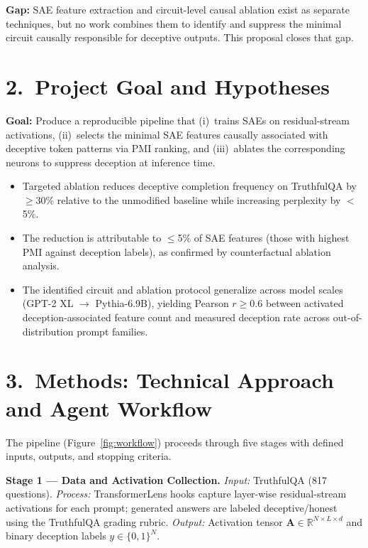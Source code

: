 \documentclass[11pt]{article}
\begin{document}
\textbf{Gap:} SAE feature extraction and circuit-level causal ablation exist as separate techniques, but no work combines them to identify and suppress the minimal circuit causally responsible for deceptive outputs. This proposal closes that gap.

\section*{2.~Project Goal and Hypotheses}

\textbf{Goal:} Produce a reproducible pipeline that (i)~trains SAEs on residual-stream activations, (ii)~selects the minimal SAE features causally associated with deceptive token patterns via PMI ranking, and (iii)~ablates the corresponding neurons to suppress deception at inference time.

\begin{itemize}
\item[\textbf{H1}] Targeted ablation reduces deceptive completion frequency on TruthfulQA by $\geq$30\% relative to the unmodified baseline while increasing perplexity by $<$5\%.
\item[\textbf{H2}] The reduction is attributable to $\leq$5\% of SAE features (those with highest PMI against deception labels), as confirmed by counterfactual ablation analysis.
\item[\textbf{H3}] The identified circuit and ablation protocol generalize across model scales (GPT-2 XL $\to$ Pythia-6.9B), yielding Pearson $r \geq 0.6$ between activated deception-associated feature count and measured deception rate across out-of-distribution prompt families.
\end{itemize}

\section*{3.~Methods: Technical Approach and Agent Workflow}

The pipeline (Figure~\ref{fig:workflow}) proceeds through five stages with defined inputs, outputs, and stopping criteria.

\textbf{Stage 1 --- Data and Activation Collection.} \emph{Input:} TruthfulQA (817 questions). \emph{Process:} TransformerLens hooks capture layer-wise residual-stream activations for each prompt; generated answers are labeled deceptive/honest using the TruthfulQA grading rubric. \emph{Output:} Activation tensor $\mathbf{A} \in \mathbb{R}^{N \times L \times d}$ and binary deception labels $y \in \{0,1\}^{N}$.
\end{document}
